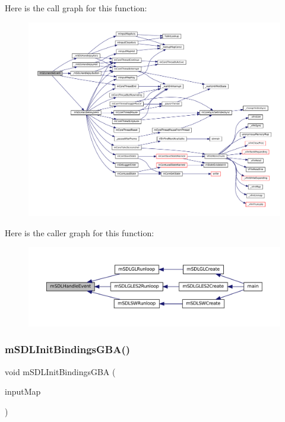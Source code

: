 Here is the call graph for this function\+:
\nopagebreak
\begin{figure}[H]
\begin{center}
\leavevmode
\includegraphics[width=350pt]{sdl-events_8c_a32623e2272fd40a24e3941e351a273a4_cgraph}
\end{center}
\end{figure}
Here is the caller graph for this function\+:
\nopagebreak
\begin{figure}[H]
\begin{center}
\leavevmode
\includegraphics[width=350pt]{sdl-events_8c_a32623e2272fd40a24e3941e351a273a4_icgraph}
\end{center}
\end{figure}
\mbox{\label{sdl-events_8c_a254830bd4cde57bec6bf2dade355902f}} 
\subsubsection{\texorpdfstring{m\+S\+D\+L\+Init\+Bindings\+G\+B\+A()}{mSDLInitBindingsGBA()}}
{\footnotesize\ttfamily void m\+S\+D\+L\+Init\+Bindings\+G\+BA (\begin{DoxyParamCaption}\item[{struct m\+Input\+Map $\ast$}]{input\+Map }\end{DoxyParamCaption})}

